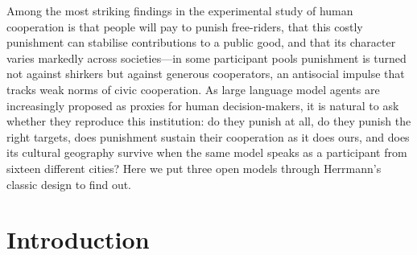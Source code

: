 \documentclass[openacc]{rsproca_new}
\begin{document}
\begin{fmtext}
Among the most striking findings in the experimental study of human cooperation is that people will pay to punish free-riders, that this costly punishment can stabilise contributions to a public good, and that its character varies markedly across societies---in some participant pools punishment is turned not against shirkers but against generous cooperators, an antisocial impulse that tracks weak norms of civic cooperation. As large language model agents are increasingly proposed as proxies for human decision-makers, it is natural to ask whether they reproduce this institution: do they punish at all, do they punish the right targets, does punishment sustain their cooperation as it does ours, and does its cultural geography survive when the same model speaks as a participant from sixteen different cities? Here we put three open models through Herrmann's classic design to find out.
\end{fmtext}

\maketitle

\section{Introduction}
\end{document}
